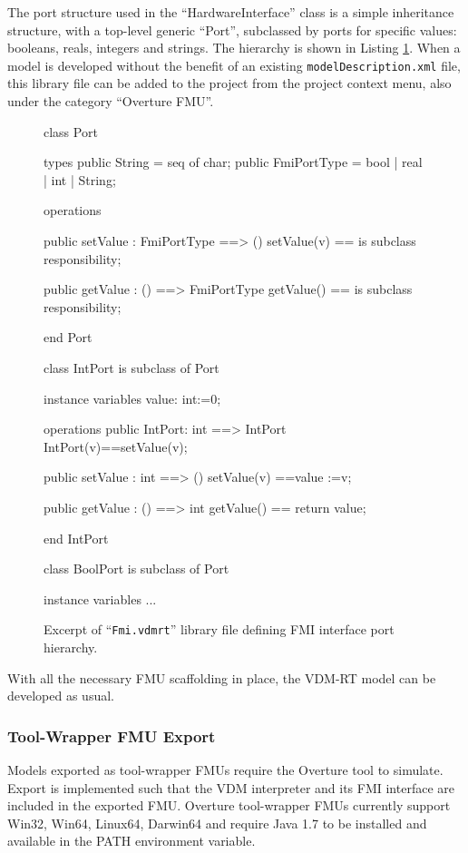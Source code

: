 \clearpage
%
%
%
The port structure used in the ``HardwareInterface'' class is a simple inheritance structure, with a top-level generic ``Port'', subclassed by ports for specific values:  booleans, reals, integers and strings.
%
The hierarchy is shown in Listing \ref{lst:fmivdmrtFile}.
%
When a model is developed without the benefit of an existing \texttt{model\-Description.\allowbreak{}xml} file, this library file can be added to the project from the project context menu, also under the category ``Overture FMU''.
%
%
%
\begin{figure}[ht]
\begin{vdmrt}
class Port

types
	public String = seq of char;
	public FmiPortType = bool | real | int | String;
 
operations

	public setValue : FmiPortType ==> ()
	setValue(v) == is subclass responsibility;

	public getValue : () ==> FmiPortType
	getValue() == is subclass responsibility;
			
end Port

class IntPort is subclass of Port

instance variables
	value: int:=0;

operations
	public IntPort: int ==> IntPort
	IntPort(v)==setValue(v);

	public setValue : int ==> ()
	setValue(v) ==value :=v;

	public getValue : () ==> int
	getValue() == return value;

end IntPort

class BoolPort is subclass of Port

instance variables
	...
\end{vdmrt}
\caption{Excerpt of ``\texttt{Fmi.vdmrt}'' library file defining FMI interface port hierarchy.}
\label{lst:fmivdmrtFile}
\end{figure}
%
%
%

With all the necessary FMU scaffolding in place, the VDM-RT model can be developed as usual.
%
%
%
\subsubsection{Tool-Wrapper FMU Export}
Models exported as tool-wrapper FMUs require the Overture tool to simulate.
%
Export is implemented such that the VDM interpreter and its FMI interface are included in the exported FMU.
%
Overture tool-wrapper FMUs currently support Win32, Win64, Linux64, Darwin64 and require Java 1.7 to be installed and available in the PATH environment variable.

